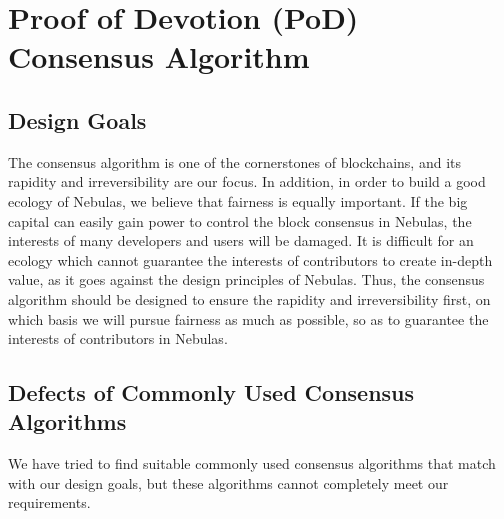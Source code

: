 \section{Proof of Devotion (PoD) Consensus Algorithm}
\label{sec:pod}

\subsection{Design Goals}
\label{pod:goals}

The consensus algorithm is one of the cornerstones of blockchains, and its rapidity and irreversibility are our focus. In addition, in order to build a good ecology of Nebulas, we believe that fairness is equally important. If the big capital can easily gain power to control the block consensus in Nebulas, the interests of many developers and users will be damaged. It is difficult for an ecology which cannot guarantee the interests of contributors to create in-depth value, as it goes against the design principles of Nebulas. Thus, the consensus algorithm should be designed to ensure the rapidity and irreversibility first, on which basis we will pursue fairness as much as possible, so as to guarantee the interests of contributors in Nebulas.


\subsection{Defects of Commonly Used Consensus Algorithms}
\label{pod:weakness}

We have tried to find suitable commonly used consensus algorithms that match with our design goals, but these algorithms cannot completely meet our requirements.


